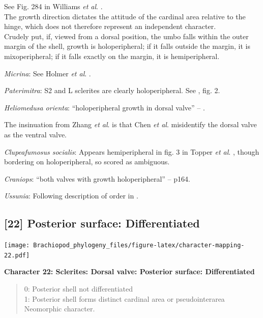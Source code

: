 \documentclass[openany]{book}
\theoremstyle{definition}
\theoremstyle{definition}
\theoremstyle{definition}
\theoremstyle{remark}
\begin{document}
See Fig. 284 in Williams \emph{et al}.
\citeyearpar{Williams1997BrachiopodaRevised}.\\
The growth direction dictates the attitude of the cardinal area relative
to the hinge, which does not therefore represent an independent
character.\\
Crudely put, if, viewed from a dorsal position, the umbo falls within
the outer margin of the shell, growth is holoperipheral; if it falls
outside the margin, it is mixoperipheral; if it falls exactly on the
margin, it is hemiperipheral.

\emph{Micrina}: See Holmer \emph{et al}.
\citeyearpar{Holmer2008TheEarly}.

\emph{Paterimitra}: S2 and L sclerites are clearly holoperipheral. See
\citet{Larsson2014iPaterimitra}, fig. 2.

\emph{Heliomedusa orienta}: ``holoperipheral growth in dorsal valve'' --
\citet{Williams2007PartH}.

The insinuation from Zhang \emph{et al}.
\citeyearpar{Zhang2009Architectureand} is that Chen \emph{et al}.
\citeyearpar{Chen2007Reinterpretationof} misidentify the dorsal valve as
the ventral valve.

\emph{Clupeafumosus socialis}: Appears hemiperipheral in fig. 3 in
Topper \emph{et al}. \citeyearpar{Topper2013Reappraisalof}, though
bordering on holoperipheral, so scored as ambiguous.

\emph{Craniops}: ``both valves with growth holoperipheral'' --
\citet{Williams2000BrachiopodaLinguliformea} p164.

\emph{Ussunia}: Following description of order in
\citet{Williams2000BrachiopodaLinguliformea}.

\hypertarget{posterior-surface-differentiated}{%
\subsection*{{[}22{]} Posterior surface:
Differentiated}\label{posterior-surface-differentiated}}

\texttt{[image: Brachiopod\_phylogeny\_files/figure-latex/character-mapping-22.pdf]}

\textbf{Character 22: Sclerites: Dorsal valve: Posterior surface:
Differentiated}

\begin{quote}
0: Posterior shell not differentiated\\
1: Posterior shell forms distinct cardinal area or pseudointerarea\\
Neomorphic character.
\end{quote}
\end{document}
